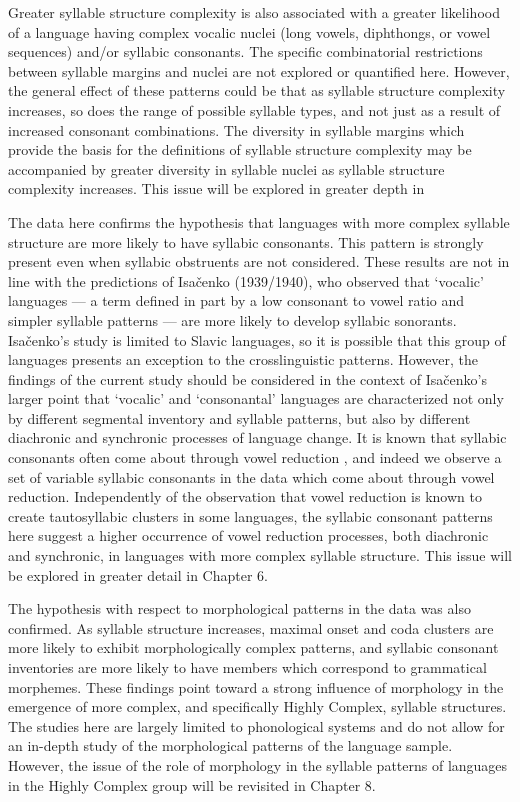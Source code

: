   Greater syllable structure complexity is also associated with a greater likelihood of a language having complex vocalic nuclei (long vowels, diphthongs, or vowel sequences) and/or syllabic consonants. The specific combinatorial restrictions between syllable margins and nuclei are not explored or quantified here. However, the general effect of these patterns could be that as syllable structure complexity increases, so does the range of possible syllable types, and not just as a result of increased consonant combinations. The diversity in syllable margins which provide the basis for the definitions of syllable structure complexity may be accompanied by greater diversity in syllable nuclei as syllable structure complexity increases. This issue will be explored in greater depth in 



  The data here confirms the hypothesis that languages with more complex syllable structure are more likely to have syllabic consonants. This pattern is strongly present even when syllabic obstruents are not considered. These results are not in line with the predictions of Isačenko (1939/1940), who observed that ‘vocalic’ languages — a term defined in part by a low consonant to vowel ratio and simpler syllable patterns — are more likely to develop syllabic sonorants. Isačenko’s study is limited to Slavic languages, so it is possible that this group of languages presents an exception to the crosslinguistic patterns. However, the findings of the current study should be considered in the context of Isačenko’s larger point that ‘vocalic’ and ‘consonantal’ languages are characterized not only by different segmental inventory and syllable patterns, but also by different diachronic and synchronic processes of language change. It is known that syllabic consonants often come about through vowel reduction \citep{Bell1978a}, and indeed we observe a set of variable syllabic consonants in the data which come about through vowel reduction. Independently of the observation that vowel reduction is known to create tautosyllabic clusters in some languages, the syllabic consonant patterns here suggest a higher occurrence of vowel reduction processes, both diachronic and synchronic, in languages with more complex syllable structure. This issue will be explored in greater detail in Chapter 6.



  The hypothesis with respect to morphological patterns in the data was also confirmed. As syllable structure increases, maximal onset and coda clusters are more likely to exhibit morphologically complex patterns, and syllabic consonant inventories are more likely to have members which correspond to grammatical morphemes. These findings point toward a strong influence of morphology in the emergence of more complex, and specifically Highly Complex, syllable structures. The studies here are largely limited to phonological systems and do not allow for an in-depth study of the morphological patterns of the language sample. However, the issue of the role of morphology in the syllable patterns of languages in the Highly Complex group will be revisited in Chapter 8.



